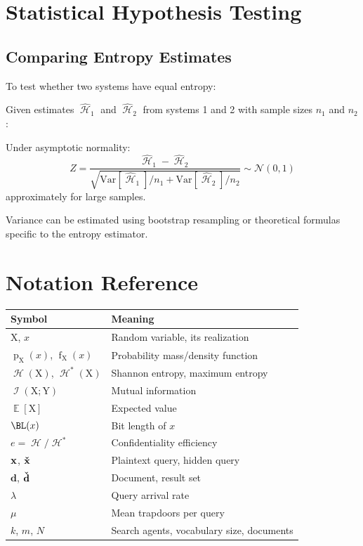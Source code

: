 \documentclass[final,11pt]{article}
\newcommand{\hrs}[1][]{%
   \ifthenelse{ \equal{#1}{} }
      {\ensuremath{\vec{\check{d}}}}
      {\ensuremath{\vec{\check{d}_{#1}}}}
}
\newcommand{\hqb}[1][]{%
   \ifthenelse{ \equal{#1}{} }
      {\ensuremath{\vec{\check{x}}}}
      {\ensuremath{\vec{\check{x}_{#1}}}}
}
\newcommand{\qb}[1][]{%
   \ifthenelse{ \equal{#1}{} }
      {\ensuremath{\vec{x}}}
      {\ensuremath{\vec{x_{#1}}}}
}
\newcommand{\rv}[1]{\mathrm{#1}}
\newcommand{\entropy}{\operatorname{\mathcal{H}}}
\newcommand{\info}{\operatorname{\mathcal{I}}}
\newcommand{\pdf}{\operatorname{f}}
\newcommand{\pmf}{\operatorname{p}}
\renewcommand{\vec}[1]{\boldsymbol{\mathbf{#1}}}
\DeclareMathOperator{\expectation}{\mathbb{E}}
\numberwithin{equation}{section}
\theoremstyle{plain}
\theoremstyle{remark}
\begin{document}
\section{Statistical Hypothesis Testing}
\label{app:hypothesis_testing}

\subsection{Comparing Entropy Estimates}
To test whether two systems have equal entropy:

Given estimates $\hat{\entropy}_1$ and $\hat{\entropy}_2$ from systems 1 and 2 with sample sizes $n_1$ and $n_2$:

Under asymptotic normality:
\begin{equation}
    Z = \frac{\hat{\entropy}_1 - \hat{\entropy}_2}{\sqrt{\text{Var}[\hat{\entropy}_1]/n_1 + \text{Var}[\hat{\entropy}_2]/n_2}} \sim \mathcal{N}(0, 1)
\end{equation}
approximately for large samples.

Variance can be estimated using bootstrap resampling or theoretical formulas specific to the entropy estimator.

\section{Notation Reference}
\label{app:notation}

\begin{table}[h]
\centering
\begin{tabular}{@{} l l @{}}
\toprule
\textbf{Symbol} & \textbf{Meaning}\\
\midrule
$\rv{X}$, $x$ & Random variable, its realization\\
$\pmf_{\rv{X}}(x)$, $\pdf_{\rv{X}}(x)$ & Probability mass/density function\\
$\entropy(\rv{X})$, $\entropy^*(\rv{X})$ & Shannon entropy, maximum entropy\\
$\info(\rv{X}; \rv{Y})$ & Mutual information\\
$\expectation[\rv{X}]$ & Expected value\\
$\BL(x)$ & Bit length of $x$\\
$e = \entropy/\entropy^*$ & Confidentiality efficiency\\
\midrule
$\qb$, $\hqb$ & Plaintext query, hidden query\\
$\vec{d}$, $\hrs$ & Document, result set\\
$\lambda$ & Query arrival rate\\
$\mu$ & Mean trapdoors per query\\
$k$, $m$, $N$ & Search agents, vocabulary size, documents\\
\bottomrule
\end{tabular}
\end{table}


\end{document}

